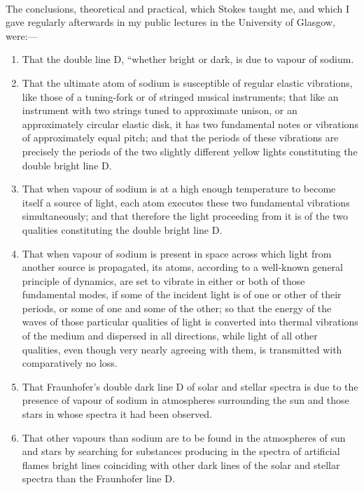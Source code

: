 \documentclass[a4paper, 11pt, oneside, english]{article}
\begin{document}
\paragraph{}
The conclusions, theoretical and practical, which Stokes taught me, and which I gave regularly afterwards in my public lectures in the University of Glasgow, were:---
\begin{enumerate}
    \item That the double line D, ``whether bright or dark, is due to vapour of sodium.
    \item That the ultimate atom of sodium is susceptible of regular elastic vibrations, like those of a tuning-fork or of stringed musical instruments; that like an instrument with two strings tuned to approximate unison, or an approximately circular elastic disk, it has two fundamental notes or vibrations of approximately equal pitch; and that the periods of these vibrations are precisely the periods of the two slightly different yellow lights constituting the double bright line D.
    \item That when vapour of sodium is at a high enough temperature to become itself a source of light, each atom executes these two fundamental vibrations simultaneously; and that therefore the light proceeding from it is of the two qualities constituting the double bright line D.
    \item That when vapour of sodium is present in space across which light from another source is propagated, its atoms, according to a well-known general principle of dynamics, are set to vibrate in either or both of those fundamental modes, if some of the incident light is of one or other of their periods, or some of one and some of the other; so that the energy of the waves of those particular qualities of light is converted into thermal vibrations of the medium and dispersed in all directions, while light of all other qualities, even though very nearly agreeing with them, is transmitted with comparatively no loss.
    \item That Fraunhofer's double dark line D of solar and stellar spectra is due to the presence of vapour of sodium in atmospheres surrounding the sun and those stars in whose spectra it had been observed.
    \item That other vapours than sodium are to be found in the atmospheres of sun and stars by searching for substances producing in the spectra of artificial flames bright lines coinciding with other dark lines of the solar and stellar spectra than the Fraunhofer line D.
\end{enumerate}
\end{document}
